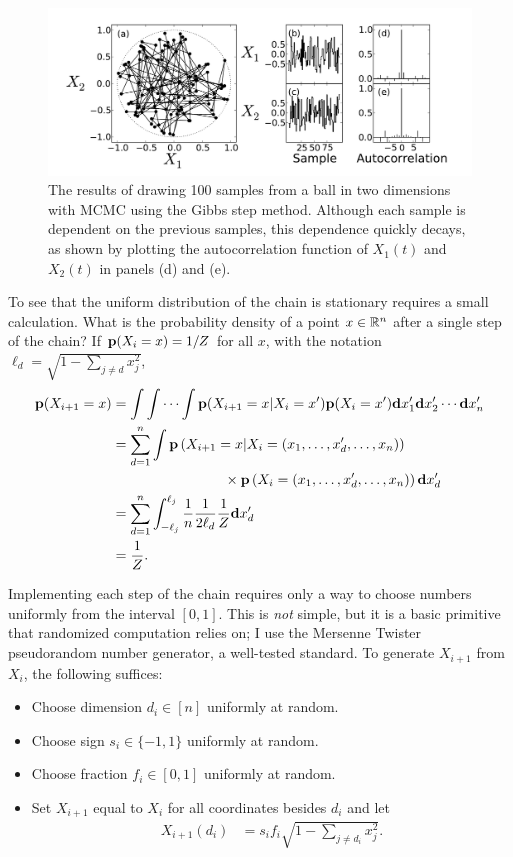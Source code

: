 \begin{figure}[ht]
\begin{center}
\includegraphics[width=\textwidth]{gibbs-ball.pdf}
\caption{The results of drawing 100 samples from a ball in two
  dimensions with MCMC using the Gibbs step method.  Although each
  sample is dependent on the previous samples, this dependence quickly
  decays, as shown by plotting the autocorrelation function of
  $X_1(t)$ and $X_2(t)$ in panels (d) and (e).}
\label{gibbs-ball}
\end{center}
\end{figure}


To see that the uniform distribution of the chain is stationary
requires a small calculation.  What is the probability density of a
point $x \in \mathbb{R}^n$ after a single step of the chain?  If
$\mathbf{p}(X_i=x) = 1/Z$ for all $x$, with the notation
$\ell_d = \sqrt{1-\sum_{j \neq d} x_j^2}$,
\begin{align*}
\mathbf{p}(X_{i+1}=x) &= \int\int\cdots\int \mathbf{p}(X_{i+1}=x|X_i=x') \mathbf{p}(X_i=x')\mathbf{d} x'_1 \mathbf{d} x'_2 \cdots \mathbf{d} x'_n\\
&=\sum_{d=1}^n \int \mathbf{p}\left(X_{i+1}=x | X_i = (x_1, \ldots, x'_d, \ldots, x_n)\right)\\
&\qquad\qquad\qquad\qquad\times \mathbf{p}\left(X_i = (x_1, \ldots, x'_d, \ldots, x_n)\right)\mathbf{d} x'_d\\
&=\sum_{d=1}^n \int_{-\ell_j}^{\ell_j} \frac{1}{n} \frac{1}{2\ell_d} \frac{1}{Z} \mathbf{d} x'_d\\
&=\frac{1}{Z}.
\end{align*}

Implementing each step of the chain requires
only a way to choose numbers uniformly from the interval $[0,1]$.  This
is \emph{not} simple, but it is a basic primitive that randomized
computation relies on; I use the Mersenne Twister pseudorandom number
generator, a well-tested standard.\cite{matsumoto_mersenne_1998}
To generate $X_{i+1}$ from $X_i$, the following suffices:
\begin{itemize}
\item Choose dimension $d_i \in [n]$ uniformly at random.
\item Choose sign $s_i \in \{-1, 1\}$ uniformly at random.
\item Choose fraction $f_i \in [0,1]$ uniformly at random.
\item Set $X_{i+1}$ equal to $X_i$ for all coordinates besides $d_i$ and let
\begin{align*}
X_{i+1}(d_i) &= s_i f_i \sqrt{1 - \sum_{j\neq d_i} x_j^2}.
\end{align*}
\end{itemize}

